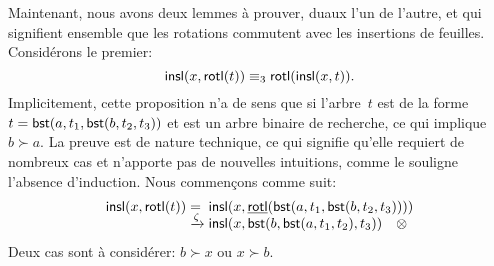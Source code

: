 \bigskip

Maintenant, nous avons deux lemmes à prouver, duaux l'un de l'autre,
et qui signifient ensemble que les rotations commutent avec
les insertions de feuilles. Considérons le premier:
\begin{equation*}
\textsf{insl}(x,\textsf{rotl}(t)) \equiv_3 \textsf{rotl}(\textsf{insl}(x,t)).
\end{equation*}
Implicitement, cette proposition n'a de sens que si l'arbre~\(t\) est
de la forme \(t=\textsf{bst}(a, t_1, \textsf{bst}(b,t_2,t_3))\) et est un
arbre binaire de recherche, ce qui implique \(b \succ a\). La preuve
est de nature technique, ce qui signifie qu'elle requiert de nombreux
cas et n'apporte pas de nouvelles intuitions, comme le souligne
l'absence d'induction. Nous commençons comme suit:
\begin{equation*}
\begin{array}{@{}r@{\;}l@{\;}l@{}}
  \fun{insl}(x,\fun{rotl}(t))
  & = &
  \fun{insl}(x,\ufun{rotl}(\fun{bst}(a, t_1,\fun{bst}(b,t_2,t_3))))\\
  & \xrightarrow{\smash{\zeta}} &
  \fun{insl}(x,\fun{bst}(b,\fun{bst}(a,t_1,t_2),t_3)) \quad \otimes
\end{array}
\end{equation*}
Deux cas sont à considérer: \(b \succ x\) ou \(x \succ b\).

